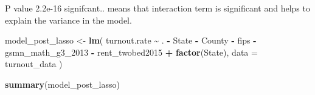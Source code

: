 \documentclass[
]{article}
\newenvironment{Shaded}{\begin{snugshade}}{\end{snugshade}}
\newcommand{\AttributeTok}[1]{\textcolor[rgb]{0.13,0.29,0.53}{#1}}
\newcommand{\FunctionTok}[1]{\textcolor[rgb]{0.13,0.29,0.53}{\textbf{#1}}}
\newcommand{\NormalTok}[1]{#1}
\newcommand{\OtherTok}[1]{\textcolor[rgb]{0.56,0.35,0.01}{#1}}
\newcommand{\SpecialCharTok}[1]{\textcolor[rgb]{0.81,0.36,0.00}{\textbf{#1}}}
\begin{document}
P value 2.2e-16 signifcant.. means that interaction term is significant
and helps to explain the variance in the model.

\begin{Shaded}
\begin{Highlighting}[]
\NormalTok{model\_post\_lasso }\OtherTok{\textless{}{-}} \FunctionTok{lm}\NormalTok{(}
\NormalTok{  turnout.rate }\SpecialCharTok{\textasciitilde{}}\NormalTok{ . }\SpecialCharTok{{-}}\NormalTok{ State }\SpecialCharTok{{-}}\NormalTok{ County }\SpecialCharTok{{-}}\NormalTok{ fips }\SpecialCharTok{{-}}\NormalTok{ gsmn\_math\_g3\_2013 }\SpecialCharTok{{-}}\NormalTok{ rent\_twobed2015 }\SpecialCharTok{+} \FunctionTok{factor}\NormalTok{(State),}
  \AttributeTok{data =}\NormalTok{ turnout\_data}
\NormalTok{)}

\FunctionTok{summary}\NormalTok{(model\_post\_lasso)}
\end{Highlighting}
\end{Shaded}
\end{document}

